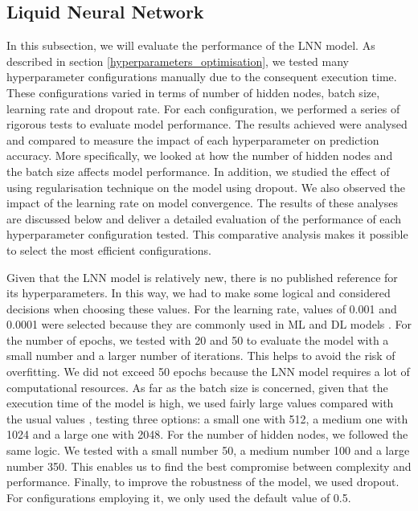 \documentclass[12pt,oneside]{book} %
\begin{document}
\subsection{Liquid Neural Network}

\noindent In this subsection, we will evaluate the performance of the LNN model. As described in section \ref{hyperparameters_optimisation}, we tested many hyperparameter configurations manually due to the consequent execution time. These configurations varied in terms of number of hidden nodes, batch size, learning rate and dropout rate. For each configuration, we performed a series of rigorous tests to evaluate model performance. The results achieved were analysed and compared to measure the impact of each hyperparameter on prediction accuracy. More specifically, we looked at how the number of hidden nodes and the batch size affects model performance. In addition, we studied the effect of using regularisation technique on the model using dropout. We also observed the impact of the learning rate on model convergence. The results of these analyses are discussed below and deliver a detailed evaluation of the performance of each hyperparameter configuration tested. This comparative analysis makes it possible to select the most efficient configurations.

\noindent Given that the LNN model is relatively new, there is no published reference for its hyperparameters. In this way, we had to make some logical and considered decisions when choosing these values. For the learning rate, values of 0.001 and 0.0001 were selected because they are commonly used in ML and DL models \cite{Bengio2012}. For the number of epochs, we tested with 20 and 50 to evaluate the model with a small number and a larger number of iterations. This helps to avoid the risk of overfitting. We did not exceed 50 epochs because the LNN model requires a lot of computational resources. As far as the batch size is concerned, given that the execution time of the model is high, we used fairly large values compared with the usual values \cite{Bengio2012}, testing three options: a small one with 512, a medium one with 1024 and a large one with 2048. For the number of hidden nodes, we followed the same logic. We tested with a small number 50, a medium number 100 and a large number 350. This enables us to find the best compromise between complexity and performance. Finally, to improve the robustness of the model, we used dropout. For configurations employing it, we only used the default value of 0.5.
\end{document}
